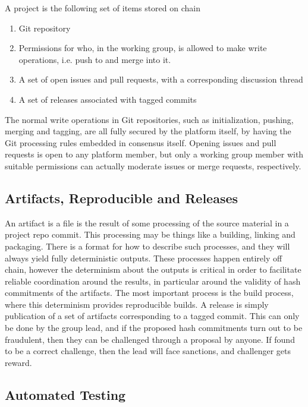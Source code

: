 \documentclass{article}
\begin{document}
A project is the following set of items stored on chain

\begin{enumerate}
    \item Git repository
    \item Permissions for who, in the working group, is allowed to make write operations, i.e. push to and merge into it.
    \item A set of open issues and pull requests, with a corresponding discussion thread
    \item A set of releases associated with tagged commits
\end{enumerate}

The normal write operations in Git repositories, such as initialization, pushing, merging and tagging, are all fully secured by the platform itself, by having the Git processing rules embedded in consensus itself. Opening issues and pull requests is open to any platform member, but only a working group member with suitable permissions can actually moderate issues or merge requests, respectively.

\subsection{Artifacts, Reproducible and Releases}

An artifact is a file is the result of some processing of the source material in a project repo commit. This processing may be things like a building, linking and packaging. There is a format for how to describe such processes, and they will always yield fully deterministic outputs. These processes happen entirely off chain, however the determinism about the outputs is critical in order to facilitate reliable coordination around the results, in particular around the validity of hash commitments of the artifacts. The most important process is the build process, where this determinism provides reproducible builds. A release is simply publication of a set of artifacts corresponding to a tagged commit. This can only be done by the group lead, and if the proposed hash commitments turn out to be fraudulent, then they can be challenged through a proposal by anyone. If found to be a correct challenge, then the lead will face sanctions, and challenger gets reward.


\subsection{Automated Testing}
\end{document}
